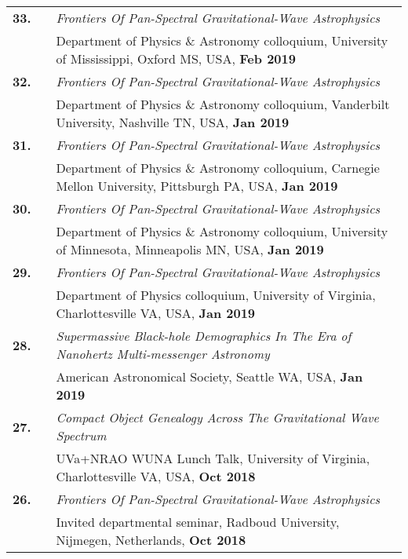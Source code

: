 \documentclass[11pt,letterpaper,sans]{moderncv}
\begin{document}
{\begin{longtable}{rp{0.3cm}p{15.8cm}}
\textbf{33.} & & \textit{Frontiers Of Pan-Spectral Gravitational-Wave Astrophysics} \\
&& Department of Physics \& Astronomy colloquium, University of Mississippi, Oxford MS, USA, \textbf{Feb 2019} \vspace{0.09cm}\\
\textbf{32.} & & \textit{Frontiers Of Pan-Spectral Gravitational-Wave Astrophysics} \\
&& Department of Physics \& Astronomy colloquium, Vanderbilt University, Nashville TN, USA, \textbf{Jan 2019} \vspace{0.09cm}\\
\textbf{31.} & & \textit{Frontiers Of Pan-Spectral Gravitational-Wave Astrophysics} \\
&& Department of Physics \& Astronomy colloquium, Carnegie Mellon University, Pittsburgh PA, USA, \textbf{Jan 2019} \vspace{0.09cm}\\
\textbf{30.} & & \textit{Frontiers Of Pan-Spectral Gravitational-Wave Astrophysics} \\
&& Department of Physics \& Astronomy colloquium, University of Minnesota, Minneapolis MN, USA, \textbf{Jan 2019} \vspace{0.09cm}\\
\textbf{29.} & & \textit{Frontiers Of Pan-Spectral Gravitational-Wave Astrophysics} \\
&& Department of Physics colloquium, University of Virginia, Charlottesville VA, USA, \textbf{Jan 2019} \vspace{0.09cm}\\
\textbf{28.} & & \textit{Supermassive Black-hole Demographics In The Era of Nanohertz Multi-messenger Astronomy} \\
&& American Astronomical Society, Seattle WA, USA, \textbf{Jan 2019} \vspace{0.09cm}\\
\textbf{27.} & & \textit{Compact Object Genealogy Across The Gravitational Wave Spectrum} \\
&& UVa+NRAO WUNA Lunch Talk, University of Virginia, Charlottesville VA, USA, \textbf{Oct 2018} \vspace{0.09cm}\\
\textbf{26.} & & \textit{Frontiers Of Pan-Spectral Gravitational-Wave Astrophysics} \\
&& Invited departmental seminar, Radboud University, Nijmegen, Netherlands, \textbf{Oct 2018} \vspace{0.09cm}\\

\end{longtable}}
\end{document}
